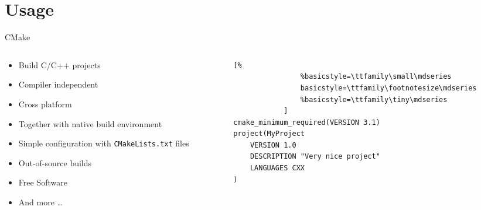 \documentclass{beamer}
\begin{document}
\section{Usage}


\begin{frame}[fragile]{CMake}
    \begin{columns}[T]
        \begin{column}{0.4\textwidth}
            \begin{itemize}
                \item Build C/C++ projects
                \item Compiler independent
                \item Cross platform
                \item Together with native build environment
                \item Simple configuration with \texttt{CMakeLists.txt} files
                \item Out-of-source builds
                \item Free Software
                \item And more …
            \end{itemize}
        \end{column}
        \begin{column}{0.6\textwidth}
            \begin{lstlisting}[%
                %basicstyle=\ttfamily\small\mdseries
                basicstyle=\ttfamily\footnotesize\mdseries
                %basicstyle=\ttfamily\tiny\mdseries
            ]
cmake_minimum_required(VERSION 3.1)
project(MyProject
    VERSION 1.0
    DESCRIPTION "Very nice project"
    LANGUAGES CXX
)
            \end{lstlisting}
        \end{column}
    \end{columns}
\end{frame}
\end{document}
